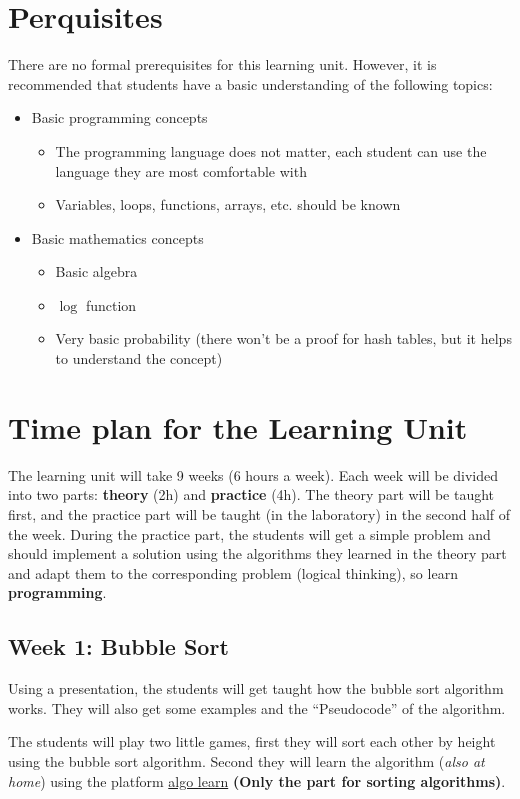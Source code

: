\documentclass[10pt, oneside]{article}
\theoremstyle{remark}
\begin{document}
\section{Perquisites}
There are no formal prerequisites for this learning unit. However, it is recommended that students have a basic understanding of the following topics:
\begin{itemize}
  \item Basic programming concepts
  \begin{itemize}
    \item The programming language does not matter, each student can use the language they are most comfortable with
    \item Variables, loops, functions, arrays, etc. should be known
  \end{itemize}
  \item Basic mathematics concepts
  \begin{itemize}
    \item Basic algebra
    \item $\log$ function
    \item Very basic probability (there won't be a proof for hash tables, but it helps to understand the concept)
  \end{itemize}
\end{itemize}

\section{Time plan for the Learning Unit}
The learning unit will take 9 weeks (6 hours a week). Each week will be divided into two parts: \textbf{theory} (2h) and \textbf{practice} (4h). The theory part will be taught first, and the practice part will be taught (in the laboratory) in the second half of the week. During the practice part, the students will get a simple problem and should implement a solution using the algorithms they learned in the theory part and adapt them to the corresponding problem (logical thinking), so learn \textbf{programming}.

\subsection{Week 1: Bubble Sort}
Using a presentation, the students will get taught how the bubble sort algorithm works. They will also get some examples and the \enquote{Pseudocode} of the algorithm. 

The students will play two little games, first they will sort each other by height using the bubble sort algorithm. Second they will learn the algorithm (\textit{also at home}) using the platform \href{https://tcs.uni-frankfurt.de/algo-learn-testing/refs_heads_feat-bubbleSort/en
}{algo learn} \textbf{(Only the part for sorting algorithms)}.
\end{document}
